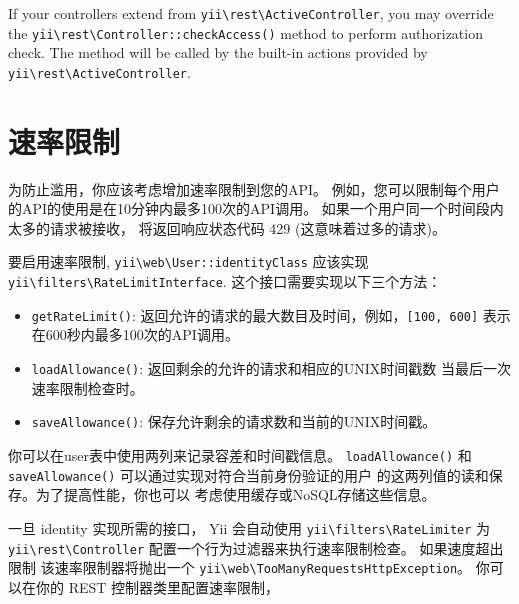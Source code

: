 If your controllers extend from \texttt{yii{\allowbreak{}\textbackslash}rest{\allowbreak{}\textbackslash}ActiveController}, you may override
the \texttt{yii{\allowbreak{}\textbackslash}rest{\allowbreak{}\textbackslash}Controller\allowbreak{}::\allowbreak{}checkAccess()} method to perform authorization check. The method
will be called by the built-in actions provided by \texttt{yii{\allowbreak{}\textbackslash}rest{\allowbreak{}\textbackslash}ActiveController}.



\label{rest-rate-limiting.md}\section{速率限制}
为防止滥用，你应该考虑增加速率限制到您的API。
例如，您可以限制每个用户的API的使用是在10分钟内最多100次的API调用。
如果一个用户同一个时间段内太多的请求被接收， 将返回响应状态代码 429 (这意味着过多的请求)。

要启用速率限制, \texttt{yii{\allowbreak{}\textbackslash}web{\allowbreak{}\textbackslash}User\allowbreak{}::\allowbreak{}identityClass} 应该实现 \texttt{yii{\allowbreak{}\textbackslash}filters{\allowbreak{}\textbackslash}RateLimitInterface}.
这个接口需要实现以下三个方法：

\begin{itemize}
\item \lstinline|getRateLimit()|: 返回允许的请求的最大数目及时间，例如，\lstinline|[100, 600]| 表示在600秒内最多100次的API调用。
\item \lstinline|loadAllowance()|: 返回剩余的允许的请求和相应的UNIX时间戳数
当最后一次速率限制检查时。
\item \lstinline|saveAllowance()|: 保存允许剩余的请求数和当前的UNIX时间戳。
\end{itemize}
你可以在user表中使用两列来记录容差和时间戳信息。
\lstinline|loadAllowance()| 和 \lstinline|saveAllowance()| 可以通过实现对符合当前身份验证的用户
的这两列值的读和保存。为了提高性能，你也可以
考虑使用缓存或NoSQL存储这些信息。

一旦 identity 实现所需的接口， Yii 会自动使用 \texttt{yii{\allowbreak{}\textbackslash}filters{\allowbreak{}\textbackslash}RateLimiter}
为 \texttt{yii{\allowbreak{}\textbackslash}rest{\allowbreak{}\textbackslash}Controller} 配置一个行为过滤器来执行速率限制检查。 如果速度超出限制
该速率限制器将抛出一个 \texttt{yii{\allowbreak{}\textbackslash}web{\allowbreak{}\textbackslash}TooManyRequestsHttpException}。 你可以在你的 REST 
控制器类里配置速率限制，

